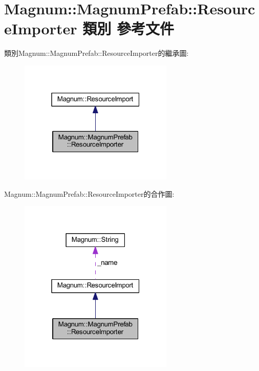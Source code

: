 \hypertarget{class_magnum_1_1_magnum_prefab_1_1_resource_importer}{}\section{Magnum\+:\+:Magnum\+Prefab\+:\+:Resource\+Importer 類別 參考文件}
\label{class_magnum_1_1_magnum_prefab_1_1_resource_importer}


類別\+Magnum\+:\+:Magnum\+Prefab\+:\+:Resource\+Importer的繼承圖\+:\nopagebreak
\begin{figure}[H]
\begin{center}
\leavevmode
\includegraphics[width=208pt]{class_magnum_1_1_magnum_prefab_1_1_resource_importer__inherit__graph}
\end{center}
\end{figure}


Magnum\+:\+:Magnum\+Prefab\+:\+:Resource\+Importer的合作圖\+:\nopagebreak
\begin{figure}[H]
\begin{center}
\leavevmode
\includegraphics[width=208pt]{class_magnum_1_1_magnum_prefab_1_1_resource_importer__coll__graph}
\end{center}
\end{figure}

